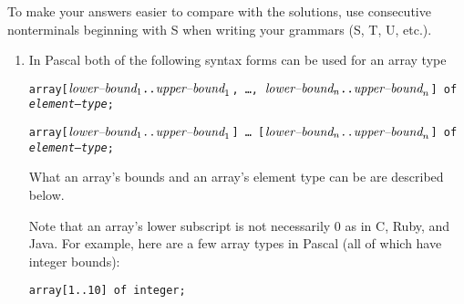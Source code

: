 \documentclass[11pt]{article}
\begin{document}

    To make your answers easier to compare with the solutions, use
  consecutive nonterminals beginning with S when writing your grammars (S,
  T, U, etc.).

  \vspace{-1.5mm}

  \begin{enumerate}

    \addtolength{\itemsep}{8mm}

    \item In Pascal both of the following syntax forms can be used for an
          array type

          \vspace{-4.5mm}

          \begin{center}

            \texttt{array[$\textit{\textrm{lower--bound}}_1\texttt{..}
                           \textit{\textrm{upper--bound}}_1$,
                          \ldots ,
                          $\textit{\textrm{lower--bound}}_n\texttt{..}
                           \textit{\textrm{upper--bound}}_n$]
                    of \textit{\textrm{element--type}};}

            \texttt{array[$\textit{\textrm{lower--bound}}_1\texttt{..}
                           \textit{\textrm{upper--bound}}_1$]%
                          \ldots%
                          [$\textit{\textrm{lower--bound}}_n\texttt{..}
                           \textit{\textrm{upper--bound}}_n$]
                    of \textit{\textrm{element--type}};}

          \end{center}

          \vspace{-4mm}

          What an array's bounds and an array's element type can be are
          described below.

          Note that an array's lower subscript is not necessarily 0 as in C,
          Ruby, and Java.  For example, here are a few array types in Pascal
          (all of which have integer bounds):

          \vspace{-2mm}

          \begin{multicols}{2}

            \texttt{array[1..10] of integer;}


\end{multicols}
\end{enumerate}
\end{document}
